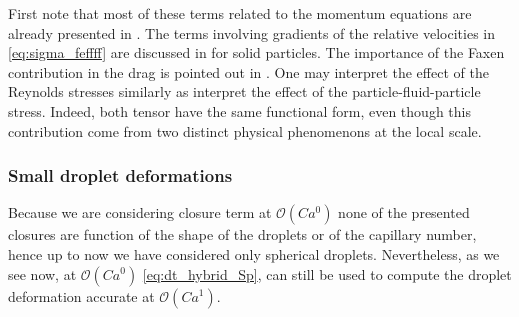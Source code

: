 First note that most of these terms related to the momentum equations are already presented in \citet[Appendix A]{zhang1997momentum}. 
The terms involving gradients of the relative velocities in \ref{eq:sigma_feffff} are discussed in \citet{nozieres1987local} for solid particles.  
The importance of the Faxen contribution in the drag is pointed out in \citet{Lhuillier_2009}. 
One may interpret the effect of the Reynolds stresses similarly as \citep{zhang2021ensemble,wang2021numerical} interpret the effect of the particle-fluid-particle stress. 
Indeed, both tensor have the same functional form, even though this contribution come from two distinct physical phenomenons at the local scale. 
 



\subsubsection{Small droplet deformations}

Because we are considering closure term at $\mathcal{O}(Ca^0)$ none of the presented closures are function of the shape of the droplets or of the capillary number, hence up to now we have considered only spherical droplets. 
Nevertheless, as we  see now, at $\mathcal{O}(Ca^0)$ \ref{eq:dt_hybrid_Sp}, can still be used to compute the droplet deformation accurate at $\mathcal{O}(Ca^1)$. 


